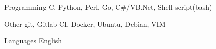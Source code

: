 

\begin{cvskills}

  \cvskill
    {Programming} %
    {C, Python, Perl, Go, C\#/VB.Net, Shell script(bash)} %

  \cvskill
    {Other} %
    {git, Gitlab CI, Docker, Ubuntu, Debian, VIM} %

  \cvskill
    {Languages} %
    {English} %

\end{cvskills}
